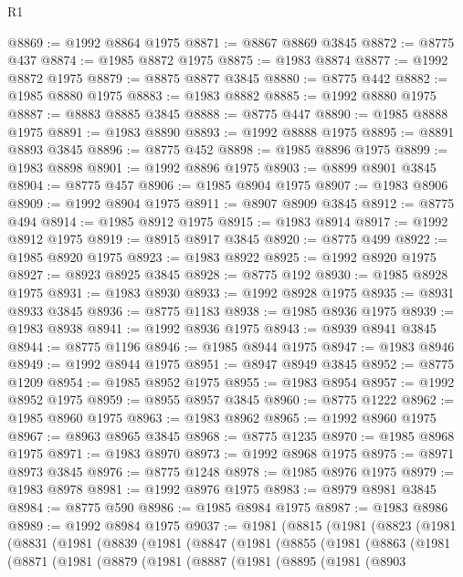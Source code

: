 \begin{lexlean}{R1}
\begin{coremodule}
@8869 := @1992 @8864 @1975
@8871 := @8867 @8869 @3845
@8872 := @8775 @437
@8874 := @1985 @8872 @1975
@8875 := @1983 @8874
@8877 := @1992 @8872 @1975
@8879 := @8875 @8877 @3845
@8880 := @8775 @442
@8882 := @1985 @8880 @1975
@8883 := @1983 @8882
@8885 := @1992 @8880 @1975
@8887 := @8883 @8885 @3845
@8888 := @8775 @447
@8890 := @1985 @8888 @1975
@8891 := @1983 @8890
@8893 := @1992 @8888 @1975
@8895 := @8891 @8893 @3845
@8896 := @8775 @452
@8898 := @1985 @8896 @1975
@8899 := @1983 @8898
@8901 := @1992 @8896 @1975
@8903 := @8899 @8901 @3845
@8904 := @8775 @457
@8906 := @1985 @8904 @1975
@8907 := @1983 @8906
@8909 := @1992 @8904 @1975
@8911 := @8907 @8909 @3845
@8912 := @8775 @494
@8914 := @1985 @8912 @1975
@8915 := @1983 @8914
@8917 := @1992 @8912 @1975
@8919 := @8915 @8917 @3845
@8920 := @8775 @499
@8922 := @1985 @8920 @1975
@8923 := @1983 @8922
@8925 := @1992 @8920 @1975
@8927 := @8923 @8925 @3845
@8928 := @8775 @192
@8930 := @1985 @8928 @1975
@8931 := @1983 @8930
@8933 := @1992 @8928 @1975
@8935 := @8931 @8933 @3845
@8936 := @8775 @1183
@8938 := @1985 @8936 @1975
@8939 := @1983 @8938
@8941 := @1992 @8936 @1975
@8943 := @8939 @8941 @3845
@8944 := @8775 @1196
@8946 := @1985 @8944 @1975
@8947 := @1983 @8946
@8949 := @1992 @8944 @1975
@8951 := @8947 @8949 @3845
@8952 := @8775 @1209
@8954 := @1985 @8952 @1975
@8955 := @1983 @8954
@8957 := @1992 @8952 @1975
@8959 := @8955 @8957 @3845
@8960 := @8775 @1222
@8962 := @1985 @8960 @1975
@8963 := @1983 @8962
@8965 := @1992 @8960 @1975
@8967 := @8963 @8965 @3845
@8968 := @8775 @1235
@8970 := @1985 @8968 @1975
@8971 := @1983 @8970
@8973 := @1992 @8968 @1975
@8975 := @8971 @8973 @3845
@8976 := @8775 @1248
@8978 := @1985 @8976 @1975
@8979 := @1983 @8978
@8981 := @1992 @8976 @1975
@8983 := @8979 @8981 @3845
@8984 := @8775 @590
@8986 := @1985 @8984 @1975
@8987 := @1983 @8986
@8989 := @1992 @8984 @1975
@9037 := @1981
    (@8815
      (@1981
        (@8823
          (@1981
            (@8831
              (@1981
                (@8839
                  (@1981
                    (@8847
                      (@1981
                        (@8855
                          (@1981
                            (@8863
                              (@1981
                                (@8871
                                  (@1981
                                    (@8879
                                      (@1981
                                        (@8887
                                          (@1981
                                            (@8895
                                              (@1981
                                                (@8903

\end{coremodule}
\end{lexlean}
